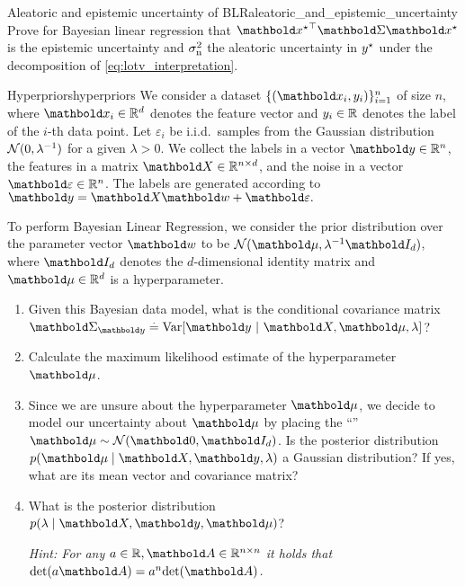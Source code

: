 \begin{nexercise}{Aleatoric and epistemic uncertainty of BLR}{aleatoric_and_epistemic_uncertainty}
  Prove for Bayesian linear regression that $\transpose{\vxs}\mSigma\vxs$ is the epistemic uncertainty and $\sigma_{\mathrm{n}}^2$ the aleatoric uncertainty in $y^\star$ under the decomposition of \cref{eq:lotv_interpretation}.
\end{nexercise}

\begin{nexercise}{Hyperpriors}{hyperpriors}
  We consider a dataset \(\{(\vx_i,y_i)\}_{i=1}^n\) of size \(n\), where \(\vx_i \in \R^d\) denotes the feature vector and \(y_i \in \mathbb{R}\) denotes the label of the \(i\)-th data point.
  Let \(\varepsilon_i\) be i.i.d.~samples from the Gaussian distribution \(\N{0}{\lambda^{-1}}\) for a given \(\lambda > 0\).
  We collect the labels in a vector \(\vy \in \R^n\), the features in a matrix \(\mX \in \R^{n \times d}\), and the noise in a vector \(\vvarepsilon \in \R^n\).
  The labels are generated according to \(\vy = \mX \vw + \vvarepsilon.\)\par
  To perform Bayesian Linear Regression, we consider the prior distribution over the parameter vector \(\vw\) to be \( \N{\vmu}{\lambda^{-1} \mI_d}\), where \(\mI_d\) denotes the \(d\)-dimensional identity matrix and \(\vmu \in \R^d\) is a hyperparameter.

  \begin{enumerate}
    \item Given this Bayesian data model, what is the conditional covariance matrix \( \mSigma_{\vy} \defeq \Var{\vy}[\mX, \vmu, \lambda] \)?

    \item Calculate the maximum likelihood estimate of the hyperparameter~\( \vmu \).

    \item Since we are unsure about the hyperparameter \( \vmu \), we decide to model our uncertainty about \( \vmu \) by placing the ``'' \({\vmu \sim \N{\vzero}{\mI_d}}\). Is the posterior distribution \(p(\vmu \mid \mX, \vy, \lambda)\) a Gaussian distribution? If yes, what are its mean vector and covariance matrix?

    \item What is the posterior distribution \( p(\lambda \mid \mX, \vy, \vmu) \)?\par
    \textit{Hint: For any \( a \in \R, \mA \in \R^{n \times n} \) it holds that \( \det{a \mA} = a^n \det{\mA} \).}
  \end{enumerate}
\end{nexercise}
